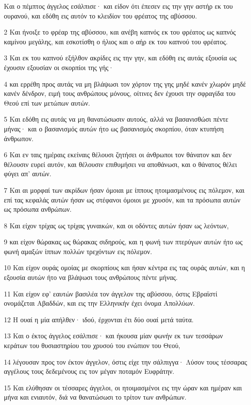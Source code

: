 \par Και ο πέμπτος άγγελος εσάλπισε· και είδον ότι έπεσεν εις την γην αστήρ εκ του ουρανού, και εδόθη εις αυτόν το κλειδίον του φρέατος της αβύσσου.
\par 2 Και ήνοιξε το φρέαρ της αβύσσου, και ανέβη καπνός εκ του φρέατος ως καπνός καμίνου μεγάλης, και εσκοτίσθη ο ήλιος και ο αήρ εκ του καπνού του φρέατος.
\par 3 Και εκ του καπνού εξήλθον ακρίδες εις την γην, και εδόθη εις αυτάς εξουσία ως έχουσιν εξουσίαν οι σκορπίοι της γής·
\par 4 και ερρέθη προς αυτάς να μη βλάψωσι τον χόρτον της γης μηδέ κανέν χλωρόν μηδέ κανέν δένδρον, ειμή τους ανθρώπους μόνους, οίτινες δεν έχουσι την σφραγίδα του Θεού επί των μετώπων αυτών.
\par 5 Και εδόθη εις αυτάς να μη θανατώσωσιν αυτούς, αλλά να βασανισθώσι πέντε μήνας· και ο βασανισμός αυτών ήτο ως βασανισμός σκορπίου, όταν κτυπήση άνθρωπον.
\par 6 Και εν ταις ημέραις εκείναις θέλουσι ζητήσει οι άνθρωποι τον θάνατον και δεν θέλουσιν ευρεί αυτόν, και θέλουσιν επιθυμήσει να αποθάνωσι, και ο θάνατος θέλει φύγει απ' αυτών.
\par 7 Και αι μορφαί των ακρίδων ήσαν όμοιαι με ίππους ητοιμασμένους εις πόλεμον, και επί τας κεφαλάς αυτών ήσαν ως στέφανοι όμοιοι με χρυσόν, και τα πρόσωπα αυτών ως πρόσωπα ανθρώπων.
\par 8 Και είχον τρίχας ως τρίχας γυναικών, και οι οδόντες αυτών ήσαν ως λεόντων,
\par 9 και είχον θώρακας ως θώρακας σιδηρούς, και η φωνή των πτερύγων αυτών ήτο ως φωνή αμαξών ίππων πολλών τρεχόντων εις πόλεμον.
\par 10 Και είχον ουράς ομοίας με σκορπίους και ήσαν κέντρα εις τας ουράς αυτών, και η εξουσία αυτών ήτο να βλάψωσι τους ανθρώπους πέντε μήνας.
\par 11 Και είχον εφ' εαυτών βασιλέα τον άγγελον της αβύσσου, όστις Εβραϊστί ονομάζεται Αβαδδών, και εις την Ελληνικήν έχει όνομα Απολλύων.
\par 12 Η ουαί η μία απήλθεν· ιδού, έρχονται έτι δύο ουαί μετά ταύτα.
\par 13 Και ο έκτος άγγελος εσάλπισε· και ήκουσα μίαν φωνήν εκ των τεσσάρων κεράτων του θυσιαστηρίου του χρυσού του ενώπιον του Θεού,
\par 14 λέγουσαν προς τον έκτον άγγελον, όστις είχε την σάλπιγγα· Λύσον τους τέσσαρας αγγέλους τους δεδεμένους εις τον μέγαν ποταμόν Ευφράτην.
\par 15 Και ελύθησαν οι τέσσαρες άγγελοι, οι ητοιμασμένοι εις την ώραν και ημέραν και μήνα και ενιαυτόν, διά να θανατώσωσι το τρίτον των ανθρώπων.
